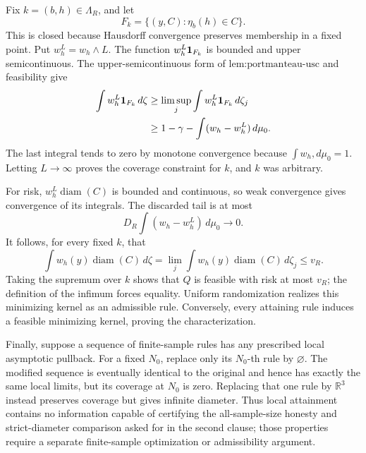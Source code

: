Fix \(k=(b,h)\in\Lambda_R\), and let
\[
 F_k=\{(y,C):\eta_b(h)\in C\}.
\]
This is closed because Hausdorff convergence preserves membership in a fixed point.  Put \(w_h^L=w_h\wedge L\).  The function \(w_h^L{\bf1}_{F_k}\) is bounded and upper semicontinuous.  The upper-semicontinuous form of \(\text{lem:portmanteau-usc}\) and feasibility give
\[
\begin{aligned}
 \int w_h^L{\bf1}_{F_k}\,d\zeta
 &\ge \limsup_j\int w_h^L{\bf1}_{F_k}\,d\zeta_j\\
 &\ge 1-\gamma-\int(w_h-w_h^L)\,d\mu_0.
\end{aligned}
\]
The last integral tends to zero by monotone convergence because \(\int w_h,d\mu_0=1\).  Letting \(L\to\infty\) proves the coverage constraint for \(k\), and \(k\) was arbitrary.

For risk, \(w_h^L\operatorname{diam}(C)\) is bounded and continuous, so weak convergence gives convergence of its integrals.  The discarded tail is at most
\[
 D_R\int(w_h-w_h^L)\,d\mu_0\longrightarrow0.
\]
It follows, for every fixed \(k\), that
\[
 \int w_h(y)\operatorname{diam}(C)\,d\zeta
 =\lim_j\int w_h(y)\operatorname{diam}(C)\,d\zeta_j
 \le v_R.
\]
Taking the supremum over \(k\) shows that \(Q\) is feasible with risk at most \(v_R\); the definition of the infimum forces equality.  Uniform randomization realizes this minimizing kernel as an admissible rule.  Conversely, every attaining rule induces a feasible minimizing kernel, proving the characterization.

Finally, suppose a sequence of finite-sample rules has any prescribed local asymptotic pullback.  For a fixed \(N_0\), replace only its \(N_0\)-th rule by \(\varnothing\).  The modified sequence is eventually identical to the original and hence has exactly the same local limits, but its coverage at \(N_0\) is zero.  Replacing that one rule by \(\mathbb R^3\) instead preserves coverage but gives infinite diameter.  Thus local attainment contains no information capable of certifying the all-sample-size honesty and strict-diameter comparison asked for in the second clause; those properties require a separate finite-sample optimization or admissibility argument.